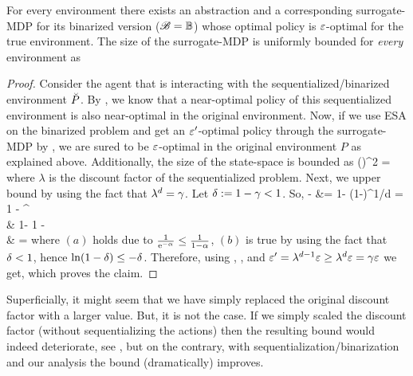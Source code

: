 \documentclass{article} %
\let\thmOrg\theorem
\let\endthmOrg\endtheorem
\renewenvironment{theorem}{\begin{tcolorbox}\thmOrg}{\endthmOrg\end{tcolorbox}}
\begin{document}
\begin{theorem}[Binary ESA] \label{thm:bin-esa}
    For every environment there exists an abstraction and a corresponding surrogate-MDP for its binarized version ($\mathscr{B} = \mathbb{B}$) whose optimal policy is $\varepsilon$-optimal for the true environment. The size of the surrogate-MDP is uniformly bounded for \emph{every} environment as
    \beqn
    \abs{\S} \leq {}
    \eeqn
\end{theorem}
\begin{proof}
    Consider the agent that is interacting with the sequentialized/binarized environment $\breve{P}$. By , we know that a near-optimal policy of this sequentialized environment is also near-optimal in the original environment. Now, if we use ESA on the binarized problem and get an $\varepsilon'$-optimal policy through the surrogate-MDP by , we are sured to be $\varepsilon$-optimal in the original environment $P$ as explained above. Additionally, the size of the state-space is bounded as
    \beq\label{eq:bound}
    \abs{\S}  \left(\right)^2 = 
    \eeq
    where $\lambda$ is the discount factor of the sequentialized problem.
    Next, we upper bound  by using the fact that $\lambda^d = \gamma$. Let $\delta := 1 - \gamma < 1$. So,
     - \lambda
    &= 1- (1-\del)^{1/d} = 1 - \e^{}\\
    & 1- 
     1 -  \\
    &\overset{}{=}  = 
    \numberthis \label{eq:bound2}
    \eqan
    where $(a)$ holds due to $\frac{1}{{\rm e}^{-\alpha}} \leq \frac{1}{1-\alpha}$, $(b)$ is true by using the fact that $\delta < 1$, hence $\ln(1-\delta) \leq - \delta$.
    Therefore, using , , and $\varepsilon' = \lambda^{d-1}\varepsilon \geq \lambda^d \varepsilon = \gamma \varepsilon$
    we get,
    \beq
    \abs{\S} \leq {} \leq  {}
    \eeq
    which proves the claim.
\end{proof}

Superficially, it might seem that we have simply replaced the original discount factor with a larger value. But, it is not the case. If we simply scaled the discount factor (without sequentializing the actions) then the resulting bound would indeed deteriorate, see , but on the contrary, with sequentialization/binarization and our analysis the bound (dramatically) improves.
\end{document}
